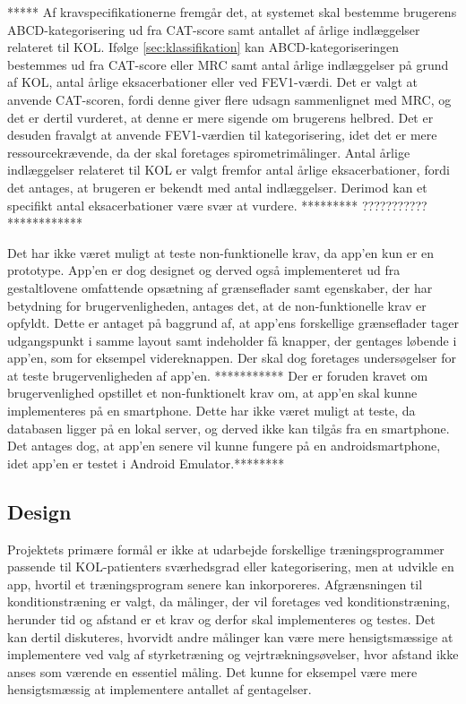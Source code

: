 *****
Af kravspecifikationerne fremgår det, at systemet skal bestemme brugerens ABCD-kategorisering ud fra CAT-score samt antallet af årlige indlæggelser relateret til KOL. Ifølge \autoref{sec:klassifikation} kan ABCD-kategoriseringen bestemmes ud fra CAT-score eller MRC samt antal årlige indlæggelser på grund af KOL, antal årlige eksacerbationer eller ved FEV1-værdi. Det er valgt at anvende CAT-scoren, fordi denne giver flere udsagn sammenlignet med MRC, og det er dertil vurderet, at denne er mere sigende om brugerens helbred. Det er desuden fravalgt at anvende FEV1-værdien til kategorisering, idet det er mere ressourcekrævende, da der skal foretages spirometrimålinger. Antal årlige indlæggelser relateret til KOL er valgt fremfor antal årlige eksacerbationer, fordi det antages, at brugeren er bekendt med antal indlæggelser. Derimod kan et specifikt antal eksacerbationer være svær at vurdere. 
********* ???????????************

Det har ikke været muligt at teste non-funktionelle krav, da app’en kun er en prototype. App’en er dog designet og derved også implementeret ud fra gestaltlovene omfattende opsætning af grænseflader samt egenskaber, der har betydning for brugervenligheden, antages det, at de non-funktionelle krav er opfyldt. Dette er antaget på baggrund af, at app'ens forskellige grænseflader tager udgangspunkt i samme layout samt indeholder få knapper, der gentages løbende i app’en, som for eksempel videreknappen. Der skal dog foretages undersøgelser for at teste brugervenligheden af app'en. *********** Der er foruden kravet om brugervenlighed opstillet et non-funktionelt krav om, at app'en skal kunne implementeres på en smartphone. Dette har ikke været muligt at teste, da databasen ligger på en lokal server, og derved ikke kan tilgås fra en smartphone. Det antages dog, at app'en senere vil kunne fungere på en androidsmartphone, idet app'en er testet i Android Emulator.********

\subsection{Design}
Projektets primære formål er ikke at udarbejde forskellige træningsprogrammer passende til KOL-patienters sværhedsgrad eller kategorisering, men at udvikle en app, hvortil et træningsprogram senere kan inkorporeres. Afgrænsningen til konditionstræning er valgt, da målinger, der vil foretages ved konditionstræning, herunder tid og afstand er et krav og derfor skal implementeres og testes. Det kan dertil diskuteres, hvorvidt andre målinger kan være mere hensigtsmæssige at implementere ved valg af styrketræning og vejrtrækningsøvelser, hvor afstand ikke anses som værende en essentiel måling. Det kunne for eksempel være mere hensigtsmæssig at implementere antallet af gentagelser. 

